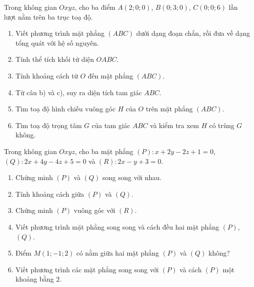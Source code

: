 \begin{bai}Trong không gian $Oxyz$, cho ba điểm $A(2;0;0)$, $B(0;3;0)$, $C(0;0;6)$ lần lượt nằm trên ba trục toạ độ.
\begin{enumerate}[label=\alph*)]
\item Viết phương trình mặt phẳng $(ABC)$ dưới dạng đoạn chắn, rồi đưa về dạng tổng quát với hệ số nguyên.
\item Tính thể tích khối tứ diện $OABC$.
\item Tính khoảng cách từ $O$ đến mặt phẳng $(ABC)$.
\item Từ câu b) và c), suy ra diện tích tam giác $ABC$.
\item Tìm toạ độ hình chiếu vuông góc $H$ của $O$ trên mặt phẳng $(ABC)$.
\item Tìm toạ độ trọng tâm $G$ của tam giác $ABC$ và kiểm tra xem $H$ có trùng $G$ không.
\end{enumerate}
\end{bai}

\begin{bai}Trong không gian $Oxyz$, cho ba mặt phẳng $(P)\colon x+2y-2z+1=0$, $(Q)\colon 2x+4y-4z+5=0$ và $(R)\colon 2x-y+3=0$.
\begin{enumerate}[label=\alph*)]
\item Chứng minh $(P)$ và $(Q)$ song song với nhau.
\item Tính khoảng cách giữa $(P)$ và $(Q)$.
\item Chứng minh $(P)$ vuông góc với $(R)$.
\item Viết phương trình mặt phẳng song song và cách đều hai mặt phẳng $(P)$, $(Q)$.
\item Điểm $M(1;-1;2)$ có nằm giữa hai mặt phẳng $(P)$ và $(Q)$ không?
\item Viết phương trình các mặt phẳng song song với $(P)$ và cách $(P)$ một khoảng bằng $2$.
\end{enumerate}
\end{bai}

